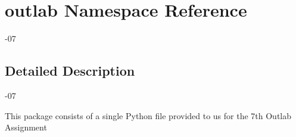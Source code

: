 \hypertarget{namespaceoutlab}{}\section{outlab Namespace Reference}
\label{namespaceoutlab}


-\/07  




\subsection{Detailed Description}
-\/07 

This package consists of a single Python file provided to us for the 7th Outlab Assignment 